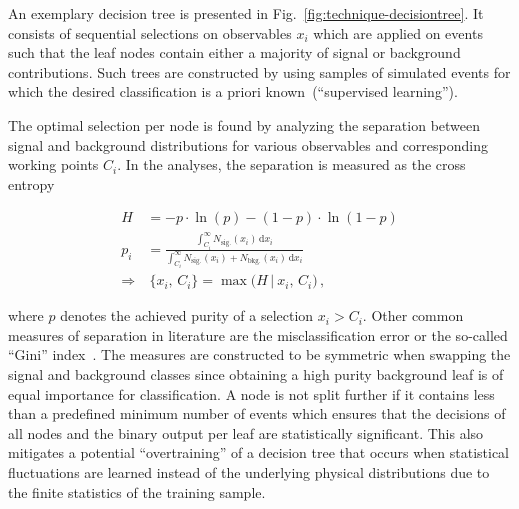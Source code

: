 An exemplary decision tree is presented in Fig.~\ref{fig:technique-decisiontree}. It consists of sequential selections on observables $x_{i}$ which are applied on events such that the leaf nodes contain either a majority of signal or background contributions. Such trees are constructed by using samples of simulated events for which the desired classification is a priori known~(``supervised learning'').


The optimal selection per node is found by analyzing the separation between signal and background distributions for various observables and corresponding working points $C_{i}$. In the analyses, the separation is measured as the cross entropy 

\begin{align}
H&=-p\cdot\ln(p)-(1-p)\cdot\ln(1-p)\\ p_{i}&=\frac{\int_{C_{i}}^{\infty} N_\mathrm{sig.}(x_{i})\,\mathrm{d}x_{i}}{\int_{C_{i}}^{\infty} N_\mathrm{sig.}(x_{i})+N_\mathrm{bkg.}(x_{i})\,\mathrm{d}x_{i}}\\
\Rightarrow &~\{x_{i},\,C_{i}\}=\max\Big(H\,\big|~x_{i},\,C_{i}\Big)\,,
\end{align}

where $p$ denotes the achieved purity of a selection $x_{i}>C_{i}$. Other common measures of separation in literature are the misclassification error or the so-called ``Gini'' index~\cite{Gini}. The measures are constructed to be symmetric when swapping the signal and background classes since obtaining a high purity background leaf is of equal importance for classification. A node is not split further if it contains less than a predefined minimum number of events which ensures that the decisions of all nodes and the binary output per leaf are statistically significant. This also mitigates a potential ``overtraining'' of a decision tree that occurs when statistical fluctuations are learned instead of the underlying physical distributions due to the finite statistics of the training sample.

